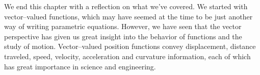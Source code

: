 We end this chapter with a reflection on what we've covered. We started with vector--valued functions, which may have seemed at the time to be just another way of writing parametric equations. However, we have seen that the vector perspective has given us great insight into the behavior of functions and the study of motion. Vector--valued position functions convey displacement, distance traveled, speed, velocity, acceleration and curvature information, each of which has great importance in science and engineering.





